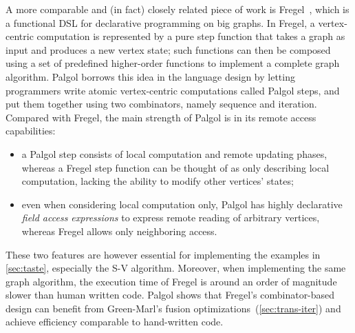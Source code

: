 \documentclass{sokendai_thesis} %
\begin{document}
A more comparable and (in fact) closely related piece of work is Fregel~\cite{fregel}, which is a functional DSL for declarative programming on big graphs.
In Fregel, a vertex-centric computation is represented by a pure step function that takes a graph as input and produces a new vertex state;
such functions can then be composed using a set of predefined higher-order functions to implement a complete graph algorithm.
Palgol borrows this idea in the language design by letting programmers write atomic vertex-centric computations called Palgol steps, and put them together using two combinators, namely sequence and iteration.
Compared with Fregel, the main strength of Palgol is in its remote access capabilities:
\begin{itemize}
 \item a Palgol step consists of local computation and remote updating phases, whereas a Fregel step function can be thought of as only describing local computation, lacking the ability to modify other vertices' states;
 \item even when considering local computation only, Palgol has highly declarative \textit{field access expressions} to express remote reading of arbitrary vertices, whereas Fregel allows only neighboring access.
\end{itemize}
These two features are however essential for implementing the examples in \autoref{sec:taste}, especially the S-V algorithm.
Moreover, when implementing the same graph algorithm, the execution time of Fregel is around an order of magnitude slower than human written code.
Palgol shows that Fregel's combinator-based design can benefit from Green-Marl's fusion optimizations~(\autoref{sec:trans-iter}) and achieve efficiency comparable to hand-written code.
\end{document}
